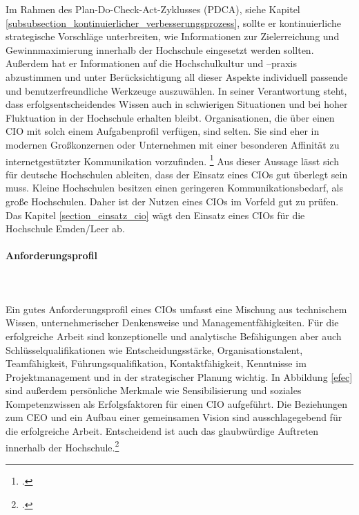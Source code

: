 Im Rahmen des Plan-Do-Check-Act-Zyklusses (PDCA), siehe Kapitel  \ref{subsubsection_kontinuierlicher_verbesserungsprozess},  sollte er kontinuierliche strategische Vorschläge unterbreiten, wie Informationen zur Zielerreichung und Gewinnmaximierung innerhalb der Hochschule eingesetzt werden sollten. Außerdem hat er Informationen auf die Hochschulkultur und –praxis  abzustimmen und unter Berücksichtigung all dieser Aspekte individuell passende und benutzerfreundliche Werkzeuge auszuwählen. In seiner Verantwortung steht, dass erfolgsentscheidendes Wissen auch in schwierigen Situationen und bei hoher Fluktuation in der Hochschule erhalten bleibt. Organisationen, die über einen CIO mit solch einem Aufgabenprofil verfügen, sind selten. Sie sind eher in modernen Großkonzernen oder Unternehmen mit einer besonderen Affinität zu internetgestützter Kommunikation vorzufinden. \footcite[Vgl.][404]{becker_gora_uhrig_2012}
Aus dieser Aussage lässt sich für deutsche Hochschulen ableiten, dass der Einsatz eines CIOs gut überlegt sein muss. Kleine Hochschulen besitzen einen geringeren Kommunikationsbedarf, als große Hochschulen. Daher ist der Nutzen eines CIOs im Vorfeld gut zu prüfen. Das Kapitel \ref{section_einsatz_cio} wägt den Einsatz eines CIOs für die Hochschule Emden/Leer ab.


\paragraph{Anforderungsprofil}\mbox{}\\\\
\label{anforderungsprofil_informationsmanager}
Ein gutes Anforderungsprofil eines CIOs umfasst eine Mischung aus technischem Wissen, unternehmerischer Denkensweise und Managementfähigkeiten. Für die erfolgreiche Arbeit sind konzeptionelle und analytische Befähigungen aber auch Schlüsselqualifikationen wie Entscheidungsstärke, Organisationstalent, Teamfähigkeit, Führungsqualifikation, Kontaktfähigkeit, Kenntnisse im Projektmanagement und  in der strategischer Planung wichtig. In Abbildung \ref{efec} sind außerdem persönliche Merkmale wie Sensibilisierung und soziales Kompetenzwissen als Erfolgsfaktoren für einen CIO aufgeführt. Die Beziehungen zum CEO und ein Aufbau einer gemeinsamen Vision sind ausschlagegebend für die erfolgreiche Arbeit. Entscheidend ist auch das glaubwürdige Auftreten innerhalb der Hochschule.\footcite[Vgl.][150]{krcmar_einfuhrung_2015}

